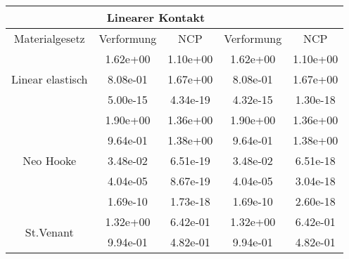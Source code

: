 \begin{table} 
\centering 
\begin{tabular}{c|cc|cc|} 
\cline{2-5} 
 & \multicolumn{2}{|c|}{Linearer Kontakt} &  \\ 
\hline 
\multicolumn{1}{|c|}{Materialgesetz} & \multicolumn{1}{c|}{Verformung} & \multicolumn{1}{c|}{NCP} & \multicolumn{1}{c|}{Verformung} & \multicolumn{1}{c|}{NCP} \\ 
\hline 
\multicolumn{1}{|c|}{\multirow{3}{*}{Linear elastisch}} &\multicolumn{1}{|c|}{  1.62e+00} & \multicolumn{1}{|c|}{  1.10e+00} & \multicolumn{1}{|c|}{  1.62e+00} & \multicolumn{1}{|c|}{  1.10e+00} \\ 
\multicolumn{1}{|c|}{} & \multicolumn{1}{|c|}{  8.08e-01} & \multicolumn{1}{|c|}{  1.67e+00} & \multicolumn{1}{|c|}{  8.08e-01} & \multicolumn{1}{|c|}{  1.67e+00} \\ 
\multicolumn{1}{|c|}{} & \multicolumn{1}{|c|}{  5.00e-15} & \multicolumn{1}{|c|}{  4.34e-19} & \multicolumn{1}{|c|}{  4.32e-15} & \multicolumn{1}{|c|}{  1.30e-18} \\ 
\hline 
\multicolumn{1}{|c|}{\multirow{5}{*}{Neo Hooke}} &\multicolumn{1}{|c|}{  1.90e+00} & \multicolumn{1}{|c|}{  1.36e+00} & \multicolumn{1}{|c|}{  1.90e+00} & \multicolumn{1}{|c|}{  1.36e+00} \\ 
\multicolumn{1}{|c|}{} & \multicolumn{1}{|c|}{  9.64e-01} & \multicolumn{1}{|c|}{  1.38e+00} & \multicolumn{1}{|c|}{  9.64e-01} & \multicolumn{1}{|c|}{  1.38e+00} \\ 
\multicolumn{1}{|c|}{} & \multicolumn{1}{|c|}{  3.48e-02} & \multicolumn{1}{|c|}{  6.51e-19} & \multicolumn{1}{|c|}{  3.48e-02} & \multicolumn{1}{|c|}{  6.51e-18} \\ 
\multicolumn{1}{|c|}{} & \multicolumn{1}{|c|}{  4.04e-05} & \multicolumn{1}{|c|}{  8.67e-19} & \multicolumn{1}{|c|}{  4.04e-05} & \multicolumn{1}{|c|}{  3.04e-18} \\ 
\multicolumn{1}{|c|}{} & \multicolumn{1}{|c|}{  1.69e-10} & \multicolumn{1}{|c|}{  1.73e-18} & \multicolumn{1}{|c|}{  1.69e-10} & \multicolumn{1}{|c|}{  2.60e-18} \\ 
\hline 
\multicolumn{1}{|c|}{\multirow{7}{*}{St.Venant}} &\multicolumn{1}{|c|}{  1.32e+00} & \multicolumn{1}{|c|}{  6.42e-01} & \multicolumn{1}{|c|}{  1.32e+00} & \multicolumn{1}{|c|}{  6.42e-01} \\ 
\multicolumn{1}{|c|}{} & \multicolumn{1}{|c|}{  9.94e-01} & \multicolumn{1}{|c|}{  4.82e-01} & \multicolumn{1}{|c|}{  9.94e-01} & \multicolumn{1}{|c|}{  4.82e-01} \\ 

\end{tabular}
\end{table}
